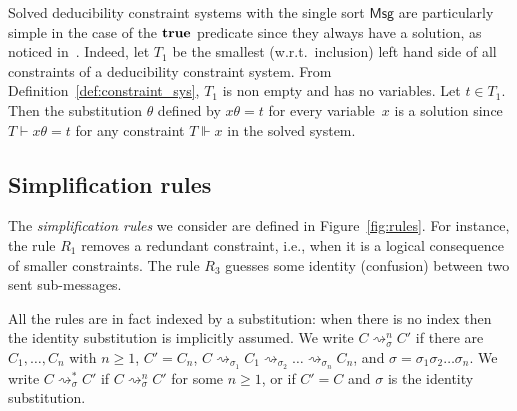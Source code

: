 \documentclass[acmtocl,acmnow]{acmtrans2m}
\newcommand{\ttrue}{\mathsf{\bf true}}
\newcommand{\term}{\mathsf{Msg}}
\newcommand{\simpl}{\rightsquigarrow}   \newcommand{\msimpl}{\rightsquigarrow}  \newcommand{\gsimpl}{\leadsto}
\newcommand{\dedsys}[1]{deducibility constraint system}
\newcommand{\dedsyss}[1]{deducibility constraint systems}
\begin{document}
Solved \dedsyss{} with the single sort $\term$ are
particularly simple in the case of the $\ttrue$ predicate since they
always have a solution, as noticed in~\cite{MS01}. Indeed, let $T_1$
be the smallest (w.r.t.~inclusion) left hand side of all constraints
of a \dedsys{}. From Definition~\ref{def:constraint_sys}, 
 $T_1$ is non empty and has no variables. Let $t\in
T_1$. Then the substitution $\theta$ defined by $x\theta=t$ for every
variable~$x$ is a solution since $T\vdash x\theta=t$ for any
constraint $T\Vdash x$ in the solved system.







\subsection{Simplification rules}\label{sec:rules}


The \emph{simplification rules} we consider are defined in
Figure~\ref{fig:rules}. For instance, the rule $R_1$  removes a redundant
constraint, i.e., when it is a logical consequence of smaller constraints.
The rule $R_3$ guesses some identity (confusion) between two sent sub-messages.

All the rules are in fact indexed by a substitution:
when there is no index then the identity substitution is implicitly
assumed. We write $C\simpl^n_{\sigma} C'$ if there are
$C_1,\dots, C_n$ with $n\ge 1$, $C'=C_n$,
$C\simpl_{\sigma_1} C_1\simpl_{\sigma_2} \dots
\simpl_{\sigma_n}C_n$, and
$\sigma=\sigma_1\sigma_2\dots\sigma_n$. We write
$C\simpl^*_{\sigma} C'$ if $C\simpl^n_{\sigma}
C'$ for some $n\geq 1$, or if $C'=C$ and $\sigma$ is the identity
substitution.
\end{document}
